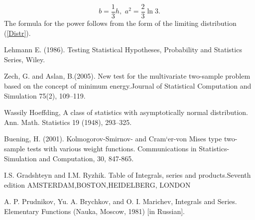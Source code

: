 \documentclass{svproc}
\begin{document}
$$
b=\frac{1}{3} h,\,\,a^2=\frac{2}{3}\ln 3.
$$
The formula for the power follows from the form of the limiting distribution  (\ref{Distr}).



\begin{thebibliography}{6}

Lehmann E. (1986).  Testing  Statistical  Hypotheses,  Probability  and  Statistics  Series,  Wiley.

Zech,  G. and Aslan, B.(2005).   New test for the multivariate two-sample problem based on the concept of minimum energy.Journal of Statistical Computation and Simulation 75(2), 109–119.

Wassily Hoeffding, A class of statistics with asymptotically normal distribution.
Ann. Math. Statistics 19 (1948), 293–325.

Buening, H. (2001). Kolmogorov-Smirnov- and Cram`er-von Mises type two-sample tests with various weight functions. Communications in Statistics-
Simulation and Computation, 30, 847-865.

I.S. Gradshteyn and I.M. Ryzhik. Table of Integrals, series and products.Seventh edition AMSTERDAM,BOSTON,HEIDELBERG, LONDON

A. P. Prudnikov, Yu. A. Brychkov, and O. I. Marichev, Integrals and Series. Elementary Functions (Nauka, Moscow, 1981) [in Russian].

\end{thebibliography}
\end{document}
